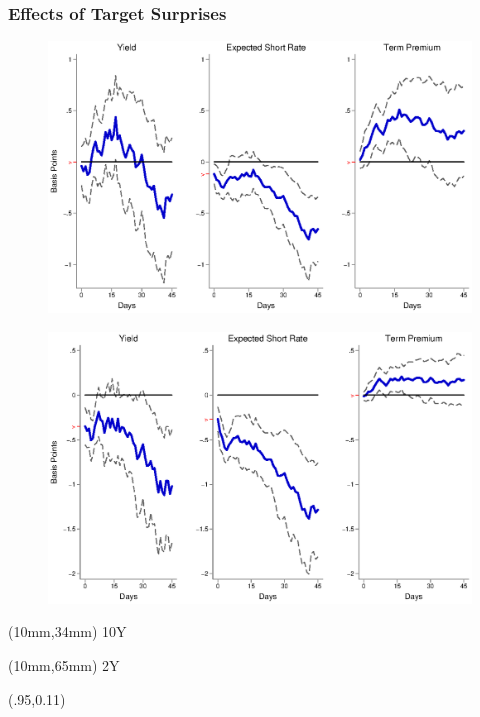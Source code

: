 \documentclass[12pt, aspectratio=169, xcolor=dvipsnames]{beamer}  %
\begin{document}
\begin{frame}[label=TargetUS]
\frametitle{Effects of Target Surprises}
\begin{figure}[!htbp]
	\begin{center} %
		\includegraphics[trim={0cm 0cm 0cm 0cm},clip,height=0.4\textheight,width=0.85\linewidth]{../Figures/LPs/LagDep-FX/Target/US/DCMP/TargetUSDnomyptp120m.eps}
		\par\end{center}
\end{figure}
\vspace{-0.5cm}
\begin{figure}[!htbp]
	\begin{center} %
		\includegraphics[trim={0cm 0cm 0cm 0.76cm},clip,height=0.4\textheight,width=0.85\linewidth]{../Figures/LPs/LagDep-FX/Target/US/DCMP/TargetUSDnomyptp24m.eps}
		\par\end{center}
\end{figure}
\begin{textblock*}{8mm}(10mm,34mm)
	\small 10Y
\end{textblock*}
\begin{textblock*}{8mm}(10mm,65mm)
	\small 2Y
\end{textblock*}
\begin{textblock*}{5cm}(.95\textwidth,0.11\textheight)
	\hyperlink{TargetEM}{}
\end{textblock*}
\end{frame}
\end{document}
